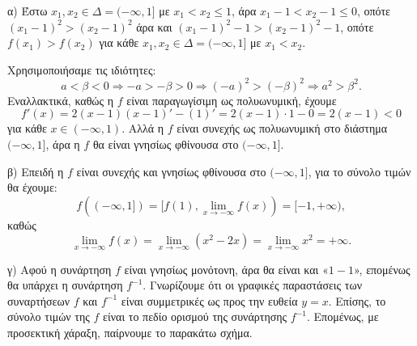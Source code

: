 α) Έστω $x_1, x_2 \in \Delta = (-\infty, 1]$ με $x_1 < x_2 \le 1$, άρα $x_1 - 1 < x_2 - 1 \le 0$, οπότε $(x_1 - 1)^2 > (x_2 - 1)^2$ άρα και $(x_1 - 1)^2 - 1 > (x_2 - 1)^2 - 1$, οπότε $f(x_1) > f(x_2)$ για κάθε $x_1, x_2 \in \Delta = (-\infty, 1]$ με $x_1 < x_2$.

Χρησιμοποιήσαμε τις ιδιότητες:
\[ a < \beta < 0 \Rightarrow -a > -\beta > 0 \Rightarrow (-a)^2 > (-\beta)^2 \Rightarrow a^2 > \beta^2. \]
Εναλλακτικά, καθώς η $f$ είναι παραγωγίσιμη ως πολυωνυμική, έχουμε
\[ f'(x) = 2(x - 1)(x - 1)' - (1)' = 2(x - 1) \cdot 1 - 0 = 2(x - 1) < 0 \]
για κάθε $x \in (-\infty, 1)$.
Αλλά η $f$ είναι συνεχής ως πολυωνυμική στο διάστημα $(-\infty, 1]$, άρα η $f$ θα είναι γνησίως φθίνουσα στο $(-\infty, 1]$.

\medskip
β) Επειδή η $f$ είναι συνεχής και γνησίως φθίνουσα στο $(-\infty, 1]$, για το σύνολο τιμών θα έχουμε:
\[ f((-\infty, 1]) = [f(1), \lim_{x \to -\infty} f(x)) = [-1, +\infty), \]
καθώς
\[ \lim_{x \to -\infty} f(x) = \lim_{x \to -\infty} (x^2 - 2x) = \lim_{x \to -\infty} x^2 = +\infty. \]

\medskip
γ) Αφού η συνάρτηση $f$ είναι γνησίως μονότονη, άρα θα είναι και «$1-1$», επομένως θα υπάρχει η συνάρτηση $f^{-1}$.
Γνωρίζουμε ότι οι γραφικές παραστάσεις των συναρτήσεων $f$ και $f^{-1}$ είναι συμμετρικές ως προς την ευθεία $y = x$.
Επίσης, το σύνολο τιμών της $f$ είναι το πεδίο ορισμού της συνάρτησης $f^{-1}$.
Επομένως, με προσεκτική χάραξη, παίρνουμε το παρακάτω σχήμα.

